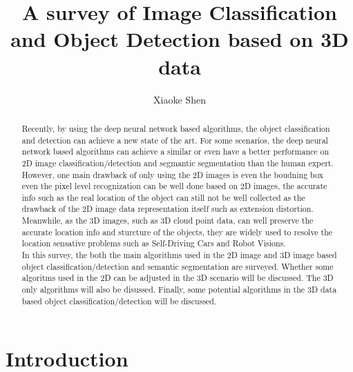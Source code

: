 \documentclass[a4paper,12pt]{article}
\title {A survey of Image Classification and Object Detection based on 3D data }
\author{Xiaoke Shen}
\affil{The Graduate Center, City University of New York}
\date{}
\begin{document}
\maketitle
\begin{abstract}
Recently, by using the deep neural network based algorithms, the object classification and detection can achieve a new state of the art. For some scenarios, the deep neural network based algorithms can achieve a similar or even have a better performance on 2D image classification/detection and segmantic segmentation than the human expert. However, one main drawback of only using the 2D images is even the boudning box even the pixel level recognization can be well done based on 2D images, the accurate info such as the real location of the object can still not be well collected as the drawback of the 2D image data representation itself such as extension distortion. Meanwhile, as the 3D images, such as 3D cloud point data, can well preserve the accurate location info and sturcture of the objects, they are widely used to resolve the location sensative problems such as Self-Driving Cars and Robot Visions.\\
In this survey, the both the main algorithms used in the 2D image and 3D image based object classification/detection and semantic segmentation are surveyed. Whether some algoritms used in the 2D can be adjusted in the 3D scenario will be discussed. The 3D only algorithms will also be disussed. Finally, some potential algorithms in the 3D data based object classification/detection will be discussed.\\
\end{abstract}
\part{Introduction}
\end{document}
